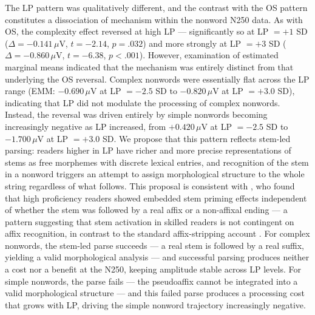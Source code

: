 The LP pattern was qualitatively different, and the contrast with the 
OS pattern constitutes a dissociation of mechanism within the nonword 
N250 data. As with OS, the complexity effect reversed at high LP --- 
significantly so at LP $= +1$ SD ($\Delta = -0.141\,\mu$V, $t = 
-2.14$, $p = .032$) and more strongly at LP $= +3$ SD ($\Delta = 
-0.860\,\mu$V, $t = -6.38$, $p < .001$). However, examination of 
estimated marginal means indicated that the mechanism was entirely 
distinct from that underlying the OS reversal. Complex nonwords were 
essentially flat across the LP range (EMM: $-0.690\,\mu$V at LP $= 
-2.5$ SD to $-0.820\,\mu$V at LP $= +3.0$ SD), indicating that LP 
did not modulate the processing of complex nonwords. Instead, the 
reversal was driven entirely by simple nonwords becoming increasingly 
negative as LP increased, from $+0.420\,\mu$V at LP $= -2.5$ SD to 
$-1.700\,\mu$V at LP $= +3.0$ SD. We propose that this pattern 
reflects stem-led parsing: readers higher in LP have richer and more 
precise representations of stems as free morphemes with discrete 
lexical entries, and recognition of the stem in a nonword triggers an 
attempt to assign morphological structure to the whole string 
regardless of what follows. This proposal is consistent with 
\citet{beyersmannEmbeddedStemPriming2016}, who found that high 
proficiency readers showed embedded stem priming effects independent 
of whether the stem was followed by a real affix or a non-affixal 
ending --- a pattern suggesting that stem activation in skilled readers 
is not contingent on affix recognition, in contrast to the standard 
affix-stripping account \citep{taft_lexical_1975, 
rastleMorphologicalDecompositionBased2008}. For complex nonwords, the 
stem-led parse succeeds --- a real stem is followed by a real suffix, 
yielding a valid morphological analysis --- and successful parsing 
produces neither a cost nor a benefit at the N250, keeping amplitude 
stable across LP levels. For simple nonwords, the parse fails --- the 
pseudoaffix cannot be integrated into a valid morphological structure 
--- and this failed parse produces a processing cost that grows with 
LP, driving the simple nonword trajectory increasingly negative.

